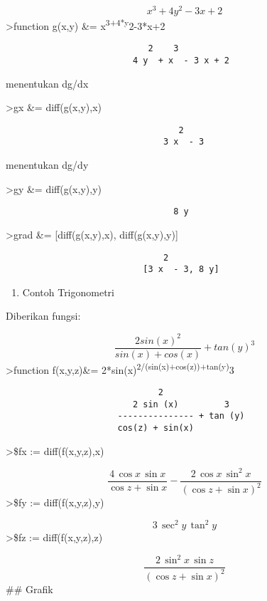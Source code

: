 \documentclass[
]{book}
\providecommand{\tightlist}{%
  \setlength{\itemsep}{0pt}\setlength{\parskip}{0pt}}
\begin{document}
\[x^3+4y^2-3x+2\]\textgreater function g(x,y) \&= x\textsuperscript{3+4*y}2-3*x+2

\begin{verbatim}
                            2    3
                         4 y  + x  - 3 x + 2
\end{verbatim}

menentukan dg/dx

\textgreater gx \&= diff(g(x,y),x)

\begin{verbatim}
                                  2
                               3 x  - 3
\end{verbatim}

menentukan dg/dy

\textgreater gy \&= diff(g(x,y),y)

\begin{verbatim}
                                 8 y
\end{verbatim}

\textgreater grad \&= {[}diff(g(x,y),x), diff(g(x,y),y){]}

\begin{verbatim}
                               2
                           [3 x  - 3, 8 y]
\end{verbatim}

\begin{enumerate}
\def\labelenumi{\arabic{enumi}.}
\setcounter{enumi}{1}
\tightlist
\item
  Contoh Trigonometri
\end{enumerate}

Diberikan fungsi:

\[\frac{2sin(x)^2}{sin(x)+cos(x)}+tan(y)^3\]\textgreater function f(x,y,z)\&= 2*sin(x)\textsuperscript{2/(sin(x)+cos(z))+tan(y)}3

\begin{verbatim}
                              2
                         2 sin (x)         3
                      --------------- + tan (y)
                      cos(z) + sin(x)
\end{verbatim}

\textgreater\$fx := diff(f(x,y,z),x)

\[\frac{4\,\cos x\,\sin x}{\cos z+\sin x}-\frac{2\,\cos x\,\sin ^2x}{
 \left(\cos z+\sin x\right)^2}\]\textgreater\$fy := diff(f(x,y,z),y)

\[3\,\sec ^2y\,\tan ^2y\]\textgreater\$fz := diff(f(x,y,z),z)

\[\frac{2\,\sin ^2x\,\sin z}{\left(\cos z+\sin x\right)^2}\]\#\# Grafik
\end{document}
